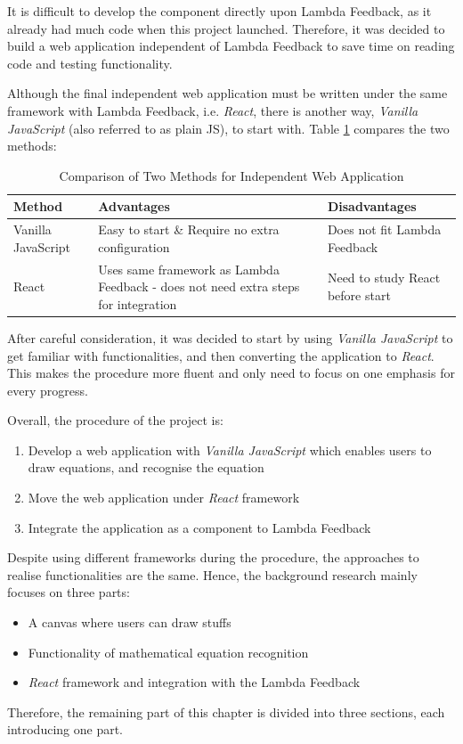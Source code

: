 \documentclass[12pt,twoside]{report}
\begin{document}
It is difficult to develop the component directly upon Lambda Feedback, as it
already had much code when this project launched. Therefore, it was decided to
build a web application independent of Lambda Feedback to save time on reading
code and testing functionality.

Although the final independent web application must be written under the same
framework with Lambda Feedback, i.e. \textit{React}, there is another way,
\textit{Vanilla JavaScript} (also referred to as plain JS), to start with. Table \ref{MethodComparison} compares the two methods:
\begin{table}[H]
    \centering
    \caption{Comparison of Two Methods for Independent Web Application}
    \label{MethodComparison}
    \begin{tabular}{|m{}|m{}|m{}|}
        \hline
        \textbf{Method} & \textbf{Advantages} & \textbf{Disadvantages}\\
        \hline
        Vanilla JavaScript & Easy to start \& Require no extra configuration&
        Does not fit Lambda Feedback\\
        \hline
        React & Uses same framework as Lambda Feedback - does not need extra steps for integration & Need to study React before start\\
        \hline
    \end{tabular}
\end{table}
After careful consideration, it was decided to start by using \textit{Vanilla JavaScript} to get familiar with functionalities, and then converting the application to \textit{React}. This makes the procedure more fluent and only need to focus on one emphasis for every progress.

Overall, the procedure of the project is:
\begin{enumerate}
    \item Develop a web application with \textit{Vanilla JavaScript} which enables users to draw equations, and recognise the equation
    \item Move the web application under \textit{React} framework
    \item Integrate the application as a component to Lambda Feedback
\end{enumerate}


Despite using different frameworks during the procedure, the approaches to realise functionalities are the same. Hence, the background research mainly focuses on three parts:
\begin{itemize}
    \item A canvas where users can draw stuffs
    \item Functionality of mathematical equation recognition
    \item \textit{React} framework and integration with the Lambda Feedback
\end{itemize}
Therefore, the remaining part of this chapter is divided into three sections, each introducing one part. 
\end{document}
